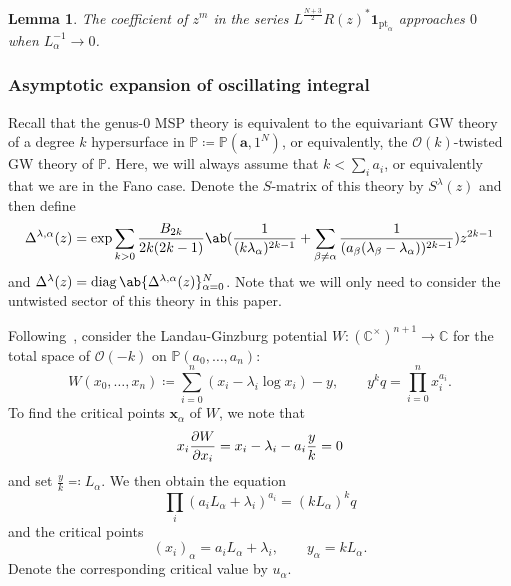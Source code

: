 \documentclass[10pt]{amsart}
\newtheorem{lem}[thm]{Lemma}
\theoremstyle{definition}
\theoremstyle{remark}
\theoremstyle{plain}
\theoremstyle{definition}
\theoremstyle{remark}
\newcommand{\C}{\mathbb{C}}
\renewcommand{\P}{\mathbb{P}}
\newcommand{\msc}[1]{\mathscr{#1}}
\newcommand{\mbf}[1]{\mathbf{#1}}
\newcommand{\mr}[1]{\mathrm{#1}}
\newcommand{\on}[1]{\operatorname{#1}}
\newcommand{\1}{\mathbf{1}}
\newcommand{\2}{\mathbf{2}}
\newcommand{\3}{\mathbf{3}}
\newcommand{\pt}{\mr{pt}}
\numberwithin{equation}{section}
\begin{document}
\begin{lem}\label{lem:vanishing}
    The coefficient of $z^m$ in the series $L^{\frac{N+3}{2}} R(z)^* \mbf{1}_{\pt_{\alpha}}$ approaches $0$ when $L_{\alpha}^{-1} \to 0$.
\end{lem}


\subsubsection{Asymptotic expansion of oscillating integral}%
\label{ssub:Asymptotic expansion of oscillating integral}

Recall that the genus-$0$ MSP theory is equivalent to the equivariant GW theory of a degree $k$ hypersurface in $\P \coloneqq \P(\mbf{a}, 1^N)$, or equivalently, the $\msc{O}(k)$-twisted GW theory of $\P$. Here, we will always assume that $k < \sum_i a_i$, or equivalently that we are in the Fano case. Denote the $S$-matrix of this theory by $S^{\lambda}(z)$ and then define
\[ \Delta^{\lambda,\alpha}(z) = \exp \sum_{k>0} \frac{B_{2k}}{2k(2k-1)} \ab(\frac{1}{( k\lambda_{\alpha} )^{2k-1}} + \sum_{\beta \neq \alpha} \frac{1}{(a_{\beta} (\lambda_{\beta} - \lambda_{\alpha}))^{2k-1}})z^{2k-1}  \]
and $\Delta^{\lambda}(z) = \on{diag} \ab\{ \Delta^{\lambda,\alpha}(z)\}_{\alpha=0}^N$. Note that we will only need to consider the untwisted sector of this theory in this paper.

Following~\cite{htmstoric}, consider the Landau-Ginzburg potential $W \colon (\C^{\times})^{n+1} \to \C$ for the total space of $\msc{O}(-k)$ on $\P(a_0, \ldots, a_n)$:
\[ W(x_0, \ldots, x_n) \coloneqq \sum_{i=0}^n (x_i - \lambda_i \log x_i) - y, \qquad y^k q = \prod_{i=0}^n x_i^{a_i}. \]
To find the critical points $\mbf{x}_{\alpha}$ of $W$, we note that
\[ x_i \pdv{W}{x_i} = x_i - \lambda_i - a_i \frac{y}{k} = 0 \]
and set $\frac{y}{k} \eqqcolon L_{\alpha}$. We then obtain the equation
\[ \prod_i (a_i L_{\alpha}+\lambda_i)^{a_i} = (kL_{\alpha})^k q \]
and the critical points
\[ (x_i)_{\alpha} = a_i L_{\alpha} + \lambda_i, \qquad y_{\alpha} = k L_{\alpha}. \]
Denote the corresponding critical value by $u_{\alpha}$.
\end{document}
